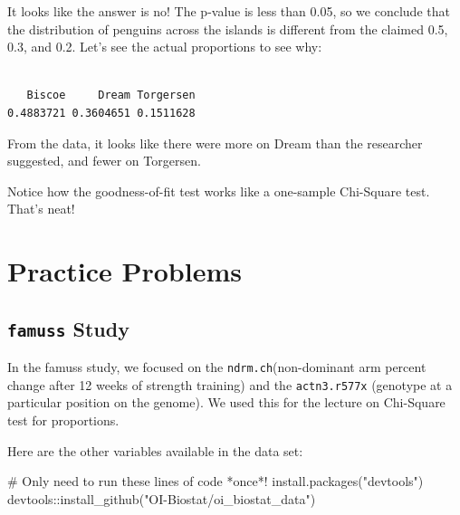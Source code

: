 \documentclass[
  letterpaper,
  DIV=11,
  numbers=noendperiod,
  oneside]{scrreprt}
\newenvironment{Shaded}{\begin{snugshade}}{\end{snugshade}}
\newcommand{\CommentTok}[1]{\textcolor[rgb]{0.37,0.37,0.37}{#1}}
\newcommand{\FunctionTok}[1]{\textcolor[rgb]{0.28,0.35,0.67}{#1}}
\newcommand{\NormalTok}[1]{\textcolor[rgb]{0.00,0.23,0.31}{#1}}
\newcommand{\SpecialCharTok}[1]{\textcolor[rgb]{0.37,0.37,0.37}{#1}}
\newcommand{\StringTok}[1]{\textcolor[rgb]{0.13,0.47,0.30}{#1}}
\begin{document}
It looks like the answer is no! The p-value is less than 0.05, so we
conclude that the distribution of penguins across the islands is
different from the claimed 0.5, 0.3, and 0.2. Let's see the actual
proportions to see why:

\begin{Shaded}
\end{Shaded}

\begin{verbatim}

   Biscoe     Dream Torgersen 
0.4883721 0.3604651 0.1511628 
\end{verbatim}

From the data, it looks like there were more on Dream than the
researcher suggested, and fewer on Torgersen.

Notice how the goodness-of-fit test works like a one-sample Chi-Square
test. That's neat!

\hypertarget{practice-problems}{%
\section{Practice Problems}\label{practice-problems}}

\hypertarget{famuss-study}{%
\subsection{\texorpdfstring{\texttt{famuss}
Study}{famuss Study}}\label{famuss-study}}

In the famuss study, we focused on the \texttt{ndrm.ch}(non-dominant arm
percent change after 12 weeks of strength training) and the
\texttt{actn3.r577x} (genotype at a particular position on the genome).
We used this for the lecture on Chi-Square test for proportions.

Here are the other variables available in the data set:

\begin{Shaded}
\begin{Highlighting}[]
\CommentTok{\# Only need to run these lines of code *once*!}
\FunctionTok{install.packages}\NormalTok{(}\StringTok{"devtools"}\NormalTok{)}
\NormalTok{devtools}\SpecialCharTok{::}\FunctionTok{install\_github}\NormalTok{(}\StringTok{"OI{-}Biostat/oi\_biostat\_data"}\NormalTok{)}
\end{Highlighting}
\end{Shaded}
\end{document}
